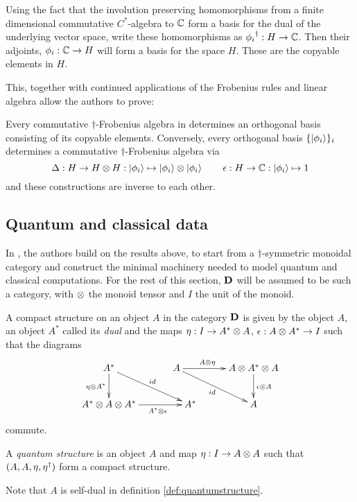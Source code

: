 Using the fact that the involution preserving homomorphisms from a finite dimensional commutative
$C^{*}$-algebra to $\mathbb{C}$ form a basis for the dual of the underlying vector space, write these
homomorphisms as ${\phi_{i}}^{\dagger}:H \to \mathbb{C}$. Then their adjoints, $\phi_{i}:\mathbb{C}\to H$ will form a
basis for the space $H$. These are the copyable elements in $H$.

This, together with continued applications of the Frobenius rules and linear algebra allow the
authors to prove:
\begin{theorem}
  Every commutative $\dagger$-Frobenius algebra in \fdh determines an orthogonal basis consisting
  of its copyable elements. Conversely, every orthogonal basis $\{\left\vert{\phi_{i}}\right\rangle\}_{i}$ determines
  a commutative $\dagger$-Frobenius algebra via \[\Delta:H\to H\otimes H: \left\vert{\phi_{i}}\right\rangle\mapsto
  \left\vert{\phi_{i}}\right\rangle \otimes \left\vert{\phi_{i}}\right\rangle\qquad\epsilon : H\to \mathbb{C} : \left\vert{\phi_{i}}\right\rangle \mapsto 1\] and these
  constructions are inverse to each other.
\end{theorem}

\subsection{Quantum and classical data}\label{sec:quantumclassical}
In \cite{coecke08structures}, the authors build on the results above,
to start from a $\dagger$-symmetric monoidal category and construct the minimal machinery needed to
model quantum and classical computations. For the rest of this section, $\mathbf{D}$ will be assumed to be
such a category, with $\otimes$ the monoid tensor and $I$ the unit of the monoid.

\begin{definition}
  A compact structure on an object $A$ in the category $\mathbf{D}$ is given by the object $A$, an object
  $A^{*}$ called its \emph{dual} and the maps $\eta:I \to A^{*}\otimes A$, $\epsilon: A\otimes A^{*} \to I$
  such that the diagrams
  \[
    \xymatrix@C+20pt{
      A^{*} \ar[dr]^{id} \ar[d]_{\eta\*A^{*}} \\
      A^{*} \*A\*A^{*}  \ar[r]_(.6){A^{*} \*\epsilon} & A^{*}
    }\hskip-3em
    \xymatrix@C+20pt{
      A \ar[r]^(.4){A\*\eta} \ar[dr]_{id} & A\* A^{*}\* A \ar[d]^{\epsilon\*A}\\
      & A
    }
  \]
  commute.
\end{definition}

\begin{definition}\label{def:quantumstructure}
  A \emph{quantum structure} is an object $A$ and map $\eta:I\to A\otimes A$ such that
  $(A,A,\eta,{\eta}^{\dagger})$ form a compact structure.
\end{definition}
Note that $A$ is self-dual in definition \ref{def:quantumstructure}.

